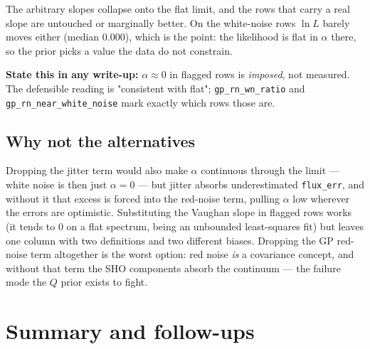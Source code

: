 \documentclass[11pt]{article}
\newcommand{\code}[1]{\texttt{#1}}
\begin{document}
The arbitrary slopes collapse onto the flat limit, and the rows that carry a real slope are
untouched or marginally better. On the white-noise rows $\ln L$ barely moves either
(median 0.000), which is the point: the likelihood is flat in $\alpha$ there, so the prior
picks a value the data do not constrain.

\textbf{State this in any write-up:} $\alpha \approx 0$ in flagged rows is \emph{imposed},
not measured. The defensible reading is "consistent with flat"; \code{gp\_rn\_wn\_ratio} and
\code{gp\_rn\_near\_white\_noise} mark exactly which rows those are.

\subsection{Why not the alternatives}

Dropping the jitter term would also make $\alpha$ continuous through the limit --- white
noise is then just $\alpha = 0$ --- but jitter absorbs underestimated \code{flux\_err}, and
without it that excess is forced into the red-noise term, pulling $\alpha$ low wherever the
errors are optimistic. Substituting the Vaughan slope in flagged rows works (it tends to 0
on a flat spectrum, being an unbounded least-squares fit) but leaves one column with two
definitions and two different biases. Dropping the GP red-noise term altogether is the
worst option: red noise \emph{is} a covariance concept, and without that term the SHO
components absorb the continuum --- the failure mode the $Q$ prior exists to fight.

\section{Summary and follow-ups}
\end{document}
